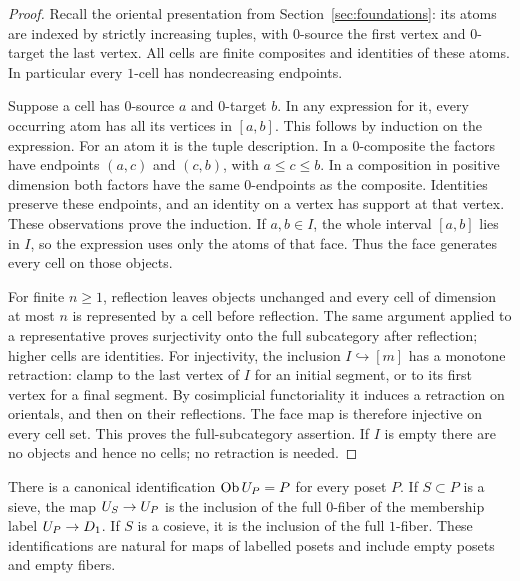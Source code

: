 \begin{proof}
Recall the oriental presentation from Section~\ref{sec:foundations}:
its atoms are indexed by strictly increasing tuples, with $0$-source
the first vertex and $0$-target the last vertex.  All cells are finite
composites and identities of these atoms.  In particular every $1$-cell
has nondecreasing endpoints.

Suppose a cell has $0$-source $a$ and $0$-target $b$.  In any expression
for it, every occurring atom has all its vertices in $[a,b]$.  This
follows by induction on the expression.  For an atom it is the tuple
description.  In a $0$-composite the factors have endpoints $(a,c)$ and
$(c,b)$, with $a\leq c\leq b$.  In a composition in positive dimension
both factors have the same $0$-endpoints as the composite.  Identities
preserve these endpoints, and an identity on a vertex has support at
that vertex.  These observations prove the induction.  If $a,b\in I$,
the whole interval $[a,b]$ lies in $I$, so the expression uses only the
atoms of that face.  Thus the face generates every cell on those
objects.

For finite $n\geq1$, reflection leaves objects unchanged and every
cell of dimension at most $n$ is represented by a cell before
reflection.  The same argument applied to a representative proves
surjectivity onto the full subcategory after reflection; higher cells
are identities.  For injectivity, the inclusion $I\hookrightarrow[m]$
has a monotone retraction: clamp to the last vertex of $I$ for an
initial segment, or to its first vertex for a final segment.  By
cosimplicial functoriality it induces a retraction on orientals, and
then on their reflections.  The face map is therefore injective on
every cell set.  This proves the full-subcategory assertion.  If $I$
is empty there are no objects and hence no cells; no retraction is
needed.
\end{proof}

\begin{lemma}\label{lem:poset-pieces}
There is a canonical identification $\operatorname{Ob}U_{P}=P$ for
every poset $P$.  If $S\subset P$ is a sieve, the map
$U_{S}\to U_{P}$ is the inclusion of the full $0$-fiber of the membership
label $U_{P}\to D_{1}$.  If $S$ is a cosieve, it is the inclusion
of the full $1$-fiber.  These identifications are natural for maps of
labelled posets and include empty posets and empty fibers.
\end{lemma}


